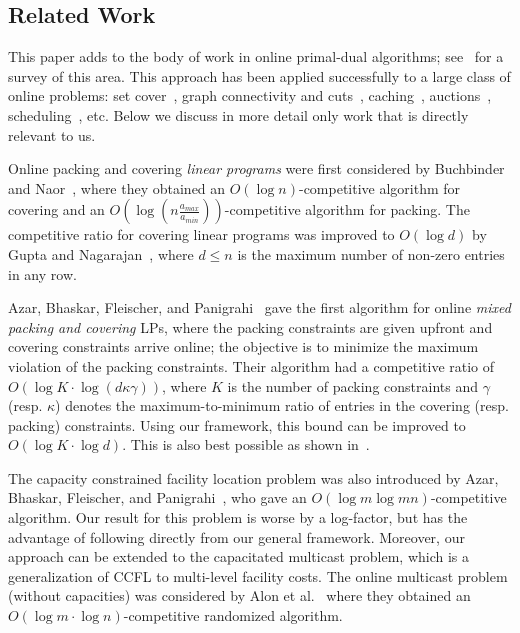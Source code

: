 \documentclass[letterpaper,11pt]{article}
\begin{document}
\subsection{Related Work}
\label{sec:related-work}

This paper adds to the body of work in online primal-dual algorithms;
see~\cite{BN-mono} for a survey of this area. This approach has been
applied successfully to a large class of online problems: set
cover~\cite{AAABN03}, graph connectivity and cuts~\cite{AAABN-talg06},
caching~\cite{BBN-focs07-paging}, auctions~\cite{HK15}, scheduling~\cite{DH14},
etc. Below we discuss in more detail only work that is directly
relevant to us.

Online packing and covering {\em linear programs} were first considered by
Buchbinder and Naor~\cite{BN-MOR}, where they obtained an $O(\log n)$-competitive algorithm for covering and an $O(\log
(n\frac{a_{max}}{a_{min}}))$-competitive algorithm for packing. The competitive ratio for covering linear
programs was improved to $O(\log d)$ by Gupta and
Nagarajan~\cite{GN12-mor}, where $d\le n$ is the maximum number of
non-zero entries in any row.

Azar, Bhaskar, Fleischer, and Panigrahi~\cite{ABFP13} gave the first
algorithm for online {\em mixed packing and covering} LPs, where the
packing constraints are given upfront and covering constraints arrive
online; the objective is to minimize the maximum violation of the
packing constraints. Their algorithm had a competitive ratio of $O(\log
K\cdot \log (d\kappa \gamma))$, where $K$ is the number of packing
constraints and $\gamma$ (resp. $\kappa$) denotes the maximum-to-minimum
ratio of entries in the covering (resp. packing) constraints. Using our
framework, this bound can be improved to $O(\log K\cdot \log d)$. This
is also best possible as shown in~\cite{ABFP13}.

The capacity constrained facility location problem was also introduced
by Azar, Bhaskar, Fleischer, and Panigrahi~\cite{ABFP13}, who gave an
$O(\log m\log mn)$-competitive algorithm. Our result for this
problem is worse by a log-factor, but has the advantage of following
directly from our general framework. Moreover, our approach can be
extended to the capacitated multicast problem, which is a generalization
of CCFL to multi-level facility costs. The online multicast problem
(without capacities) was considered by Alon et al.~\cite{AAABN-talg06}
where they obtained an $O(\log m\cdot \log n)$-competitive randomized
algorithm.
\end{document}
